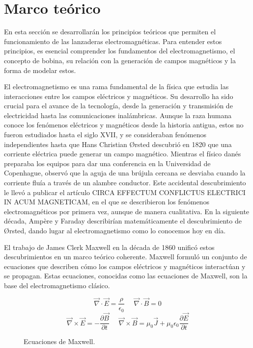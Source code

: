 \section{Marco teórico}
\label{sec:marcoteorico}

En esta sección se desarrollarán los principios teóricos que permiten el funcionamiento de las lanzaderas electromagnéticas. Para entender estos principios, es esencial comprender los fundamentos del electromagnetismo, el concepto de bobina, su relación con la generación de campos magnéticos y la forma de modelar estos.

El electromagnetismo es una rama fundamental de la física que estudia las interacciones entre los campos eléctricos y magnéticos. Su desarrollo ha sido crucial para el avance de la tecnología, desde la generación y transmisión de electricidad hasta las comunicaciones inalámbricas. Aunque la raza humana conoce los fenómenos eléctricos y magnéticos desde la historia antigua, estos no fueron estudiados hasta el siglo XVII, y se consideraban fenómenos independientes hasta que Hans Christian Ørsted descubrió en 1820 que una corriente eléctrica puede generar un campo magnético. Mientras el físico danés preparaba los equipos para dar una conferencia en la Universidad de Copenhague, observó que la aguja de una brújula cercana se desviaba cuando la corriente fluía a través de un alambre conductor. Este accidental descubrimiento le llevó a publicar el artículo CIRCA EFFECTUM CONFLICTUS ELECTRICI IN ACUM MAGNETICAM, en el que se describieron los fenómenos electromagnéticos por primera vez, aunque de manera cualitativa. En la siguiente década, Ampère y Faraday describirían matemáticamente el descubrimiento de Ørsted, dando lugar al electromagnetismo como lo conocemos hoy en día. \citep{oersted2024}

El trabajo de James Clerk Maxwell en la década de 1860 unificó estos descubrimientos en un marco teórico coherente. Maxwell formuló un conjunto de ecuaciones que describen cómo los campos eléctricos y magnéticos interactúan y se propagan. Estas ecuaciones, conocidas como las ecuaciones de Maxwell, son la base del electromagnetismo clásico.

\begin{figure}[H]
    \centering
    \[
    \vec{\nabla}\cdot \vec{E}= \frac{\rho}{\epsilon_0}~~~~~~\vec{\nabla}\cdot \vec{B}= 0
    \]
    \[
    \vec{\nabla}\times\vec{E}=-\frac{\partial\vec{B}}{\partial t}~~~~~~\vec{\nabla}\times \vec{B}=\mu_0\vec{J}+\mu_0\epsilon_0\frac{\partial \vec{E}}{\partial t}
    \]
    \caption{Ecuaciones de Maxwell.\citep{purcell2013electricidad}}
    \label{fig:maxwell_equations}
\end{figure}

